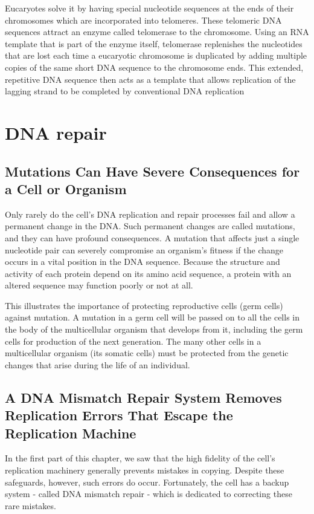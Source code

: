 Eucaryotes solve it by having special nucleotide
sequences at the ends of their chromosomes which are incorporated
into telomeres. These telomeric DNA sequences attract an enzyme called
telomerase to the chromosome. Using an RNA template that is part of
the enzyme itself, telomerase replenishes the nucleotides that are lost
each time a eucaryotic chromosome is duplicated by adding multiple
copies of the same short DNA sequence to the chromosome ends. This
extended, repetitive DNA sequence then acts as a template that allows
replication of the lagging strand to be completed by conventional DNA
replication


\section{DNA repair}

\subsection{Mutations Can Have Severe Consequences for a Cell or Organism}

Only rarely do the cell’s DNA replication and repair processes fail and
allow a permanent change in the DNA. Such permanent changes are
called mutations, and they can have profound consequences. A mutation
that affects just a single nucleotide pair can severely compromise
an organism’s fitness if the change occurs in a vital position in the DNA
sequence. Because the structure and activity of each protein depend on
its amino acid sequence, a protein with an altered sequence may function
poorly or not at all.

This illustrates the importance of protecting reproductive cells (germ cells) against
mutation. A mutation in a germ cell will be passed on to all the cells in
the body of the multicellular organism that develops from it, including the
germ cells for production of the next generation.
The many other cells in a multicellular organism (its somatic cells) must
be protected from the genetic changes that arise during the life of an
individual.

\subsection{A DNA Mismatch Repair System Removes Replication Errors That Escape the Replication Machine}

In the first part of this chapter, we saw that the high fidelity of the cell’s
replication machinery generally prevents mistakes in copying. Despite
these safeguards, however, such errors do occur. Fortunately, the cell
has a backup system - called DNA mismatch repair - which is dedicated
to correcting these rare mistakes.

